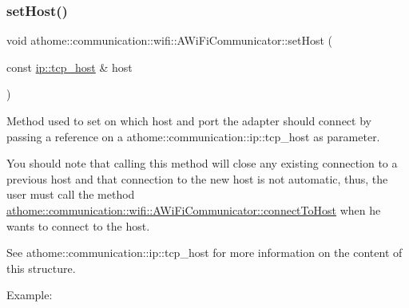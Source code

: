 \subsubsection{\texorpdfstring{set\+Host()}{setHost()}}
{\footnotesize\ttfamily void athome\+::communication\+::wifi\+::\+A\+Wi\+Fi\+Communicator\+::set\+Host (\begin{DoxyParamCaption}\item[{const \mbox{\hyperlink{structathome_1_1communication_1_1ip_1_1s__host}{ip\+::tcp\+\_\+host}} \&}]{host }\end{DoxyParamCaption})}

Method used to set on which host and port the adapter should connect by passing a reference on a athome\+::communication\+::ip\+::tcp\+\_\+host as parameter.

You should note that calling this method will close any existing connection to a previous host and that connection to the new host is not automatic, thus, the user must call the method \mbox{\hyperlink{classathome_1_1communication_1_1wifi_1_1_a_wi_fi_communicator_ac81395d55c9a6824136d7b63fdb096f0}{athome\+::communication\+::wifi\+::\+A\+Wi\+Fi\+Communicator\+::connect\+To\+Host}} when he wants to connect to the host.

See athome\+::communication\+::ip\+::tcp\+\_\+host for more information on the content of this structure.

Example\+:


